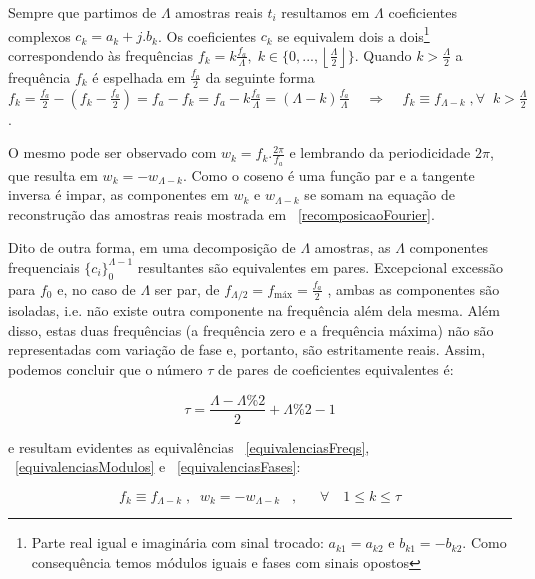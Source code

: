 Sempre que partimos de $\Lambda$ amostras reais $t_i$ resultamos em $\Lambda$ coeficientes complexos $c_k=a_k+j.b_k$. Os coeficientes $c_k$ se equivalem dois a dois\footnote{Parte real igual e imaginária com sinal trocado: $a_{k1}=a_{k2}$ e $b_{k1}=-b_{k2}$. Como consequência temos módulos iguais e fases com sinais opostos} correspondendo às frequências $f_k = k\frac{f_a}{\Lambda}, \; k \in \{0, ..., \left \lfloor \frac{\Lambda}{2} \right \rfloor \} $.
Quando $k> \frac{\Lambda}{2} $
a frequência $f_k$ é espelhada em $\frac{f_a}{2}$ da seguinte forma $f_k=\frac{f_a}{2} - (f_k-\frac{f_a}{2})=f_a-f_k=f_a - k\frac{f_a}{\Lambda}=(\Lambda-k)\frac{f_a}{\Lambda} \;\;\;\; \Rightarrow \;\;\;\; f_k\equiv f_{\Lambda-k} \; , \forall \;\; k>\frac{\Lambda}{2}$. 

 
 O mesmo pode ser observado com 
 $w_k=f_k.\frac{2\pi}{f_a}$ e lembrando da periodicidade $2\pi$, que resulta em $w_k=-w_{\Lambda-k}$. Como o coseno é uma função par e a tangente inversa é impar, as componentes em $w_k$ e $w_{\Lambda-k}$ se somam na equação de reconstrução das amostras reais mostrada em ~\ref{recomposicaoFourier}.

  Dito de outra forma, em uma decomposição de $\Lambda$ amostras, as $\Lambda$ componentes frequenciais $\{c_i\}_0^{\Lambda-1}$ resultantes
   são equivalentes em pares.
   Excepcional excessão para $f_0$ e, no caso de $\Lambda$ ser par, de $f_{\Lambda/2}=f_{\text{máx}}=\frac{f_a}{2}$ , ambas as componentes são isoladas, i.e. não existe outra componente na frequência além dela mesma. Além disso, estas duas frequências (a frequência zero e a frequência máxima) não são representadas com variação de fase e, portanto, são estritamente reais. Assim, podemos 
   concluir que o número $\tau$ de pares de coeficientes equivalentes é:

\begin{equation}\label{coefsPareados}
\tau = \frac{\Lambda - \Lambda \% 2}{2} +\Lambda \% 2 -1
\end{equation}

e resultam evidentes as equivalências ~\ref{equivalenciasFreqs}, ~\ref{equivalenciasModulos} e ~\ref{equivalenciasFases}:

\begin{equation}\label{equivalenciasFreqs}
f_{k}\equiv f_{\Lambda-k}\;, \;\; w_{k}=-w_{\Lambda-k}\;\;\;, \quad \;\; \forall \quad 1 \leq k \leq \tau  
\end{equation}

